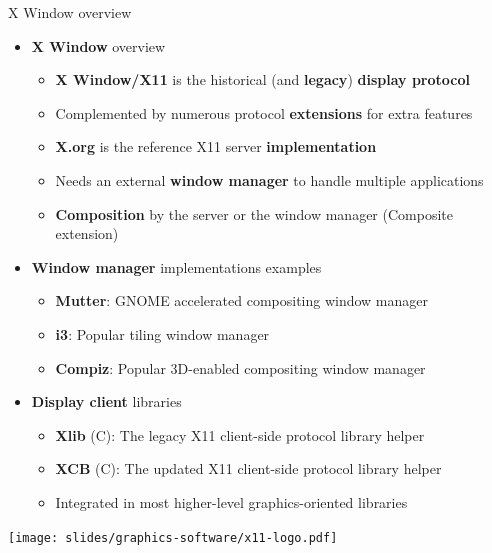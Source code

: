 \begin{frame}{X Window overview}
  \begin{itemize}
  \item \textbf{X Window} overview
    \begin{itemize}
    \item \textbf{X Window/X11} is the historical (and \textbf{legacy}) \textbf{display protocol}
    \item Complemented by numerous protocol \textbf{extensions} for extra features
    \item \textbf{X.org} is the reference X11 server \textbf{implementation}
    \item Needs an external \textbf{window manager} to handle multiple applications
    \item \textbf{Composition} by the server or the window manager (Composite extension)
    \end{itemize}
  \end{itemize}
  \begin{minipage}[b]{0.8\textwidth}
  \begin{itemize}
  \item \textbf{Window manager} implementations examples
    \begin{itemize}
    \item \textbf{Mutter}: GNOME accelerated compositing window manager
    \item \textbf{i3}: Popular tiling window manager
    \item \textbf{Compiz}: Popular 3D-enabled compositing window manager
    \end{itemize}
  \item \textbf{Display client} libraries
    \begin{itemize}
    \item \textbf{Xlib} (C): The legacy X11 client-side protocol library helper
    \item \textbf{XCB} (C): The updated X11 client-side protocol library helper
    \item Integrated in most higher-level graphics-oriented libraries
    \end{itemize}
  \end{itemize}
  \end{minipage}
  \begin{minipage}[b]{0.15\textwidth}
  \texttt{[image: slides/graphics-software/x11-logo.pdf]}
  \end{minipage}
\end{frame}

